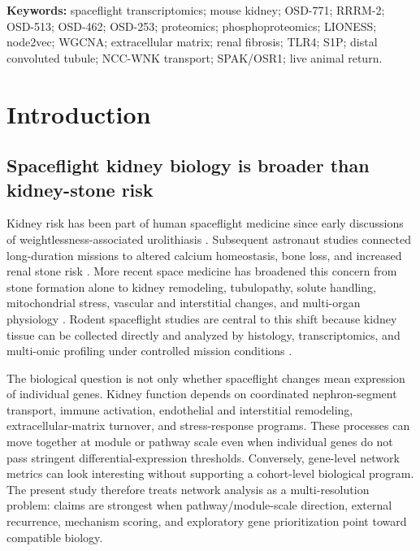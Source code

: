 \documentclass[11pt]{article}
\begin{document}
\vspace{0.3em}
\noindent\textbf{Keywords:} spaceflight transcriptomics; mouse kidney; OSD-771; RRRM-2; OSD-513; OSD-462; OSD-253; proteomics; phosphoproteomics; LIONESS; node2vec; WGCNA; extracellular matrix; renal fibrosis; TLR4; S1P; distal convoluted tubule; NCC-WNK transport; SPAK/OSR1; live animal return.

\clearpage
\tableofcontents
\clearpage

\section{Introduction}

\subsection{Spaceflight kidney biology is broader than kidney-stone risk}

Kidney risk has been part of human spaceflight medicine since early discussions of weightlessness-associated urolithiasis \citep{cockett1962astronautical}. Subsequent astronaut studies connected long-duration missions to altered calcium homeostasis, bone loss, and increased renal stone risk \citep{pietrzyk2007renal,smith2014men}. More recent space medicine has broadened this concern from stone formation alone to kidney remodeling, tubulopathy, solute handling, mitochondrial stress, vascular and interstitial changes, and multi-organ physiology \citep{siew2024cosmic,chouker2025impact,afshinnekoo2020fundamental}. Rodent spaceflight studies are central to this shift because kidney tissue can be collected directly and analyzed by histology, transcriptomics, and multi-omic profiling under controlled mission conditions \citep{daSilveira2020comprehensive,galazka2020rnaseq,finch2025strain}.

The biological question is not only whether spaceflight changes mean expression of individual genes. Kidney function depends on coordinated nephron-segment transport, immune activation, endothelial and interstitial remodeling, extracellular-matrix turnover, and stress-response programs. These processes can move together at module or pathway scale even when individual genes do not pass stringent differential-expression thresholds. Conversely, gene-level network metrics can look interesting without supporting a cohort-level biological program. The present study therefore treats network analysis as a multi-resolution problem: claims are strongest when pathway/module-scale direction, external recurrence, mechanism scoring, and exploratory gene prioritization point toward compatible biology.
\end{document}

